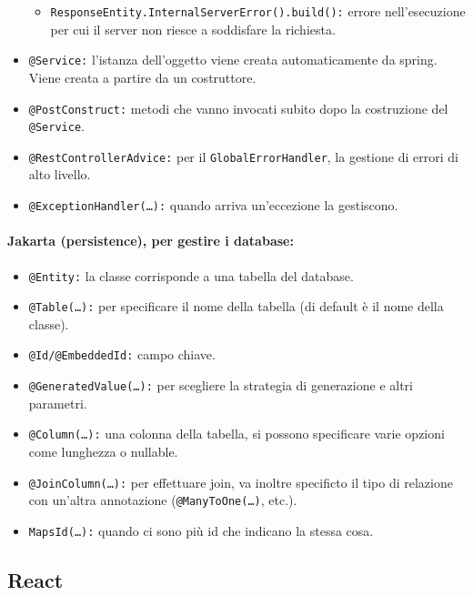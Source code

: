 \begin{itemize}
\begin{itemize}
		      \item \texttt{ResponseEntity.InternalServerError().build():} errore nell'esecuzione per cui il server non riesce a soddisfare la richiesta.
	      \end{itemize}
	\item \texttt{@Service:} l'istanza dell'oggetto viene creata automaticamente da spring. Viene creata a partire da un costruttore.
	\item \texttt{@PostConstruct:} metodi che vanno invocati subito dopo la costruzione del \texttt{@Service}.
	\item \texttt{@RestControllerAdvice:} per il \texttt{GlobalErrorHandler}, la gestione di errori di alto livello.
	\item \texttt{@ExceptionHandler(\dots):} quando arriva un'eccezione la gestiscono.
\end{itemize}

\paragraph{Jakarta (persistence), per gestire i database:}

\begin{itemize}
	\item \texttt{@Entity:} la classe corrisponde a una tabella del database.
	\item \texttt{@Table(\dots):} per specificare il nome della tabella (di default è il nome della classe).
	\item \texttt{@Id/@EmbeddedId:} campo chiave.
	\item \texttt{@GeneratedValue(\dots):} per scegliere la strategia di generazione e altri parametri.
	\item \texttt{@Column(\dots):} una colonna della tabella, si possono specificare varie opzioni come lunghezza o nullable.
	\item \texttt{@JoinColumn(\dots):} per effettuare join, va inoltre specificto il tipo di relazione con un'altra annotazione (\texttt{@ManyToOne(\dots)}, etc.).
	\item \texttt{MapsId(\dots):} quando ci sono più id che indicano la stessa cosa.
\end{itemize}



\subsection{React}





